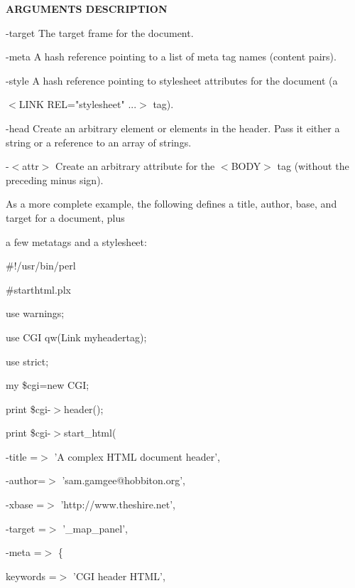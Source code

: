 \documentclass[a4paper,11pt]{book}
\begin{document}
\noindent 

\noindent \textbf{ARGUMENTS DESCRIPTION}

\noindent 

\noindent -target The target frame for the document.

\noindent 

\noindent -meta A hash reference pointing to a list of meta tag names (content pairs).

\noindent 

\noindent -style A hash reference pointing to stylesheet attributes for the document (a

\noindent $<$LINK REL="stylesheet" ...$>$ tag).

\noindent 

\noindent -head Create an arbitrary element or elements in the header. Pass it either a string or a reference to an array of strings.

\noindent 

\noindent -$<$attr$>$ Create an arbitrary attribute for the $<$BODY$>$ tag (without the preceding minus sign).

\noindent 

\noindent As a more complete example, the following defines a title, author, base, and target for a document, plus

\noindent a few metatags and a stylesheet:

\noindent 

\noindent \#!/usr/bin/perl

\noindent \#starthtml.plx

\noindent use warnings;

\noindent use CGI qw(Link myheadertag);

\noindent use strict;

\noindent 

\noindent my \$cgi=new CGI;

\noindent 

\noindent print \$cgi-$>$header();

\noindent print \$cgi-$>$start\_html(

\noindent -title =$>$ 'A complex HTML document header',

\noindent -author=$>$ 'sam.gamgee@hobbiton.org',

\noindent -xbase =$>$ 'http://www.theshire.net',

\noindent -target =$>$ '\_map\_panel',

\noindent -meta =$>$ \{

\noindent keywords =$>$ 'CGI header HTML',
\end{document}
